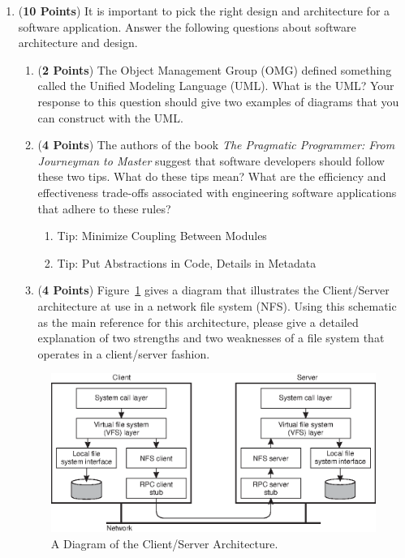 \documentclass[12pt,epsf,psfig,graphics]{article}
\begin{document}
\begin{enumerate}
\newpage

\item ({\bf 10 Points}) It is important to pick the right design and
  architecture for a software application.  Answer the following
  questions about software architecture and design.

\begin{enumerate}

\item ({\bf 2 Points}) The Object Management Group (OMG) defined
  something called the Unified Modeling Language (UML).  What is the
  UML?  Your response to this question should give two examples of
  diagrams that you can construct with the UML.

\item ({\bf 4 Points}) The authors of the book {\em The Pragmatic
  Programmer: From Journeyman to Master} suggest that software
  developers should follow these two tips.  What do these tips mean?
  What are the efficiency and effectiveness trade-offs associated with
  engineering software applications that adhere to these rules?

  \begin{enumerate}

  \item Tip: Minimize Coupling Between Modules

  \item Tip: Put Abstractions in Code, Details in Metadata

  \end{enumerate}

\item ({\bf 4 Points}) Figure~\ref{fig:cs} gives a diagram that
  illustrates the Client/Server architecture at use in a network file
  system (NFS).  Using this schematic as the main reference for this
  architecture, please give a detailed explanation of two strengths
  and two weaknesses of a file system that operates in a client/server
  fashion.

\end{enumerate}

\begin{figure}[h]
\begin{center}
\includegraphics{11-02.eps}
\end{center}
\vspace*{-.2in}
\caption{A Diagram of the Client/Server Architecture.}
\vspace*{-.15in}
\label{fig:cs}
\end{figure}


\end{enumerate}
\end{document}
